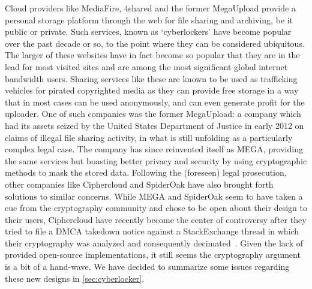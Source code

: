 \documentclass[11pt]{article}
\begin{document}


Cloud providers like MediaFire, 4shared and the former MegaUpload provide a personal storage platform through the web for file sharing and archiving, be it public or private.
Such services, known as `cyberlockers' have become popular over the past decade or so, to the point where they can be considered ubiquitous.
The larger of these websites have in fact become so popular that they are in the lead for most visited sites and are among the most significant global internet bandwidth users.
Sharing services like these are known to be used as trafficking vehicles for pirated copyrighted media as they can provide free storage in a way that in most cases can be used anonymously, and can even generate profit for the uploader.
One of such companies was the former MegaUpload: a company which had its assets seized by the United States Department of Justice in early 2012 on claims of illegal file sharing activity, in what is still unfolding as a particularly complex legal case.
The company has since reinvented itself as MEGA, providing the same services but boasting better privacy and security by using cryptographic methods to mask the stored data.
Following the (foreseen) legal prosecution, other companies like Ciphercloud and SpiderOak have also brought forth solutions to similar concerns.
While MEGA and SpiderOak seem to have taken a cue from the cryptography community and chose to be open about their design to their users, Ciphercloud have recently become the center of controversy after they tried to file a DMCA takedown notice against a StackExchange thread in which their cryptography was analyzed and consequently decimated~\cite{ciphercloud}.
Given the lack of provided open-source implementations, it still seems the cryptography argument is a bit of a hand-wave.
We have decided to summarize some issues regarding these new designs in \autoref{sec:cyberlocker}.
\end{document}
